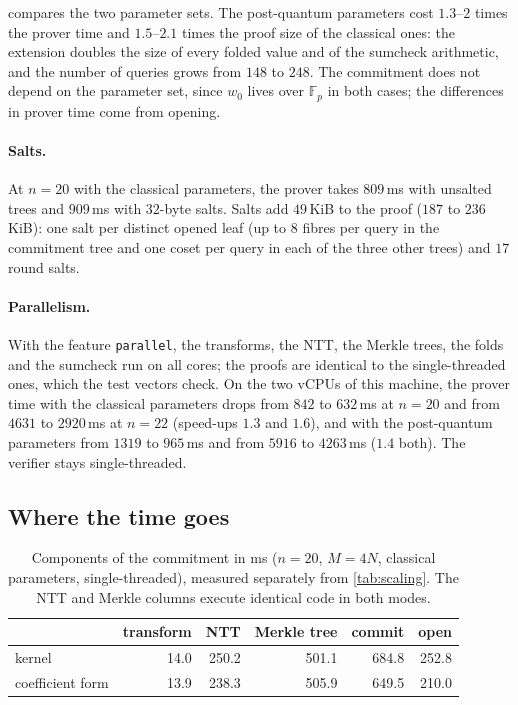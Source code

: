  compares the two parameter sets.
The post-quantum parameters cost $1.3$--$2$ times the prover time and $1.5$--$2.1$ times the proof size of the classical ones: the extension doubles the size of every folded value and of the sumcheck arithmetic, and the number of queries grows from $148$ to $248$.
The commitment does not depend on the parameter set, since $w_0$ lives over $\mathbb{F}_p$ in both cases; the differences in prover time come from opening.

\paragraph{Salts.}
At $n = 20$ with the classical parameters, the prover takes $809$\,ms with unsalted trees and $909$\,ms with $32$-byte salts.
Salts add $49$\,KiB to the proof ($187$ to $236$\,KiB): one salt per distinct opened leaf (up to $8$ fibres per query in the commitment tree and one coset per query in each of the three other trees) and $17$ round salts.

\paragraph{Parallelism.}
With the feature \texttt{parallel}, the transforms, the NTT, the Merkle trees, the folds and the sumcheck run on all cores; the proofs are identical to the single-threaded ones, which the test vectors check.
On the two vCPUs of this machine, the prover time with the classical parameters drops from $842$ to $632$\,ms at $n = 20$ and from $4631$ to $2920$\,ms at $n = 22$ (speed-ups $1.3$ and $1.6$), and with the post-quantum parameters from $1319$ to $965$\,ms and from $5916$ to $4263$\,ms ($1.4$ both).
The verifier stays single-threaded.

\subsection{Where the time goes}\label{sec:exp:breakdown}

\begin{table}[t]
\centering
\small
\begin{tabular}{l rrrr r}
\toprule
 & transform & NTT & Merkle tree & commit & open \\
\midrule
kernel & 14.0 & 250.2 & 501.1 & 684.8 & 252.8 \\
coefficient form & 13.9 & 238.3 & 505.9 & 649.5 & 210.0 \\
\bottomrule
\end{tabular}
\caption{Components of the commitment in ms ($n = 20$, $M = 4N$, classical parameters, single-threaded), measured separately from \cref{tab:scaling}. The NTT and Merkle columns execute identical code in both modes.}
\label{tab:breakdown}
\end{table}

